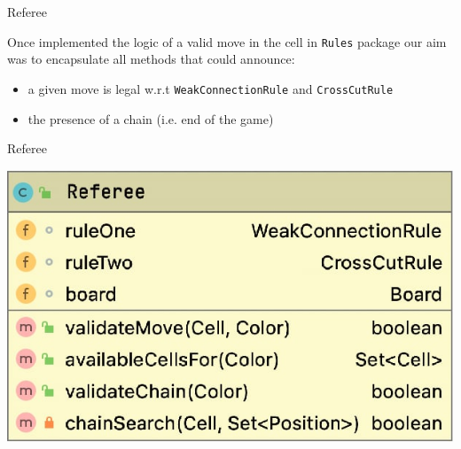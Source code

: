 \documentclass{beamer}
\begin{document}
\begin{frame}{Referee}
	
	Once implemented the logic of a valid move in the cell in \texttt{Rules} package our aim was to encapsulate all methods that could announce:
	\vspace{0.4cm}
	\begin{itemize}
		\item a given move is legal w.r.t \texttt{WeakConnectionRule} and \texttt{CrossCutRule}
		\vspace{0.35cm}
		\item the presence of a chain (i.e. end of the game)
	\end{itemize}
	
\end{frame}

\begin{frame}{Referee}
	\begin{center}
		\includegraphics[scale=0.32]{images/referee-class.jpg}
	\end{center}
\end{frame}
     
\end{document}
